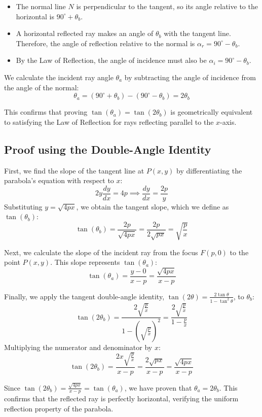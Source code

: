 \documentclass{article}
\begin{document}
\begin{itemize}
    \item The normal line $N$ is perpendicular to the tangent, so its angle relative to the horizontal is $90^\circ + \theta_b$.
    \item A horizontal reflected ray makes an angle of $\theta_b$ with the tangent line. Therefore, the angle of reflection relative to the normal is $\alpha_r = 90^\circ - \theta_b$.
    \item By the Law of Reflection, the angle of incidence must also be $\alpha_i = 90^\circ - \theta_b$.
\end{itemize}

We calculate the incident ray angle $\theta_a$ by subtracting the angle of incidence from the angle of the normal:
\[ \theta_a = (90^\circ + \theta_b) - (90^\circ - \theta_b) = 2\theta_b \]

This confirms that proving $\tan(\theta_a) = \tan(2\theta_b)$ is geometrically equivalent to satisfying the Law of Reflection for rays reflecting parallel to the $x$-axis.

\subsection{Proof using the Double-Angle Identity}
First, we find the slope of the tangent line at $P(x, y)$ by differentiating the parabola's equation with respect to $x$:
\[ 2y \frac{dy}{dx} = 4p \implies \frac{dy}{dx} = \frac{2p}{y} \]
Substituting $y = \sqrt{4px}$, we obtain the tangent slope, which we define as $\tan(\theta_b)$:
\[ \tan(\theta_b) = \frac{2p}{\sqrt{4px}} = \frac{2p}{2\sqrt{px}} = \sqrt{\frac{p}{x}} \]

Next, we calculate the slope of the incident ray from the focus $F(p, 0)$ to the point $P(x, y)$. This slope represents $\tan(\theta_a)$:
\[ \tan(\theta_a) = \frac{y - 0}{x - p} = \frac{\sqrt{4px}}{x - p} \]

Finally, we apply the tangent double-angle identity, $\tan(2\theta) = \frac{2\tan\theta}{1 - \tan^2\theta}$, to $\theta_b$:
\[ \tan(2\theta_b) = \frac{2\sqrt{\frac{p}{x}}}{1 - \left(\sqrt{\frac{p}{x}}\right)^2} = \frac{2\sqrt{\frac{p}{x}}}{1 - \frac{p}{x}} \]
Multiplying the numerator and denominator by $x$:
\[ \tan(2\theta_b) = \frac{2x\sqrt{\frac{p}{x}}}{x - p} = \frac{2\sqrt{px}}{x - p} = \frac{\sqrt{4px}}{x - p} \]

Since $\tan(2\theta_b) = \frac{\sqrt{4px}}{x - p} = \tan(\theta_a)$, we have proven that $\theta_a = 2\theta_b$. This confirms that the reflected ray is perfectly horizontal, verifying the uniform reflection property of the parabola.
\end{document}
